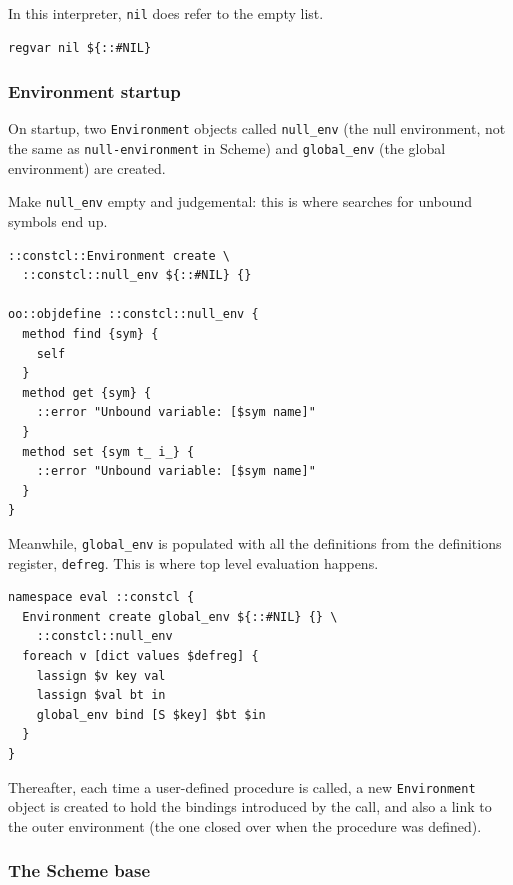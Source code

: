 \documentclass[a5paper,draft]{memoir}
\begin{document}
In this interpreter, \texttt{nil} does refer to the empty list.

\begin{lstlisting}
regvar nil ${::#NIL}
\end{lstlisting}

\subsubsection{Environment startup}
\label{environment-startup}

On startup, two \texttt{Environment} objects called \texttt{null\_env} (the null environment, not the same as \texttt{null-environment} in Scheme) and \texttt{global\_env} (the global environment) are created.

Make \texttt{null\_env} empty and judgemental: this is where searches for unbound symbols end up.

\begin{lstlisting}
::constcl::Environment create \
  ::constcl::null_env ${::#NIL} {}

oo::objdefine ::constcl::null_env {
  method find {sym} {
    self
  }
  method get {sym} {
    ::error "Unbound variable: [$sym name]"
  }
  method set {sym t_ i_} {
    ::error "Unbound variable: [$sym name]"
  }
}
\end{lstlisting}

Meanwhile, \texttt{global\_env} is populated with all the definitions from the definitions register, \texttt{defreg}. This is where top level evaluation happens.
\index{global\_env environment}

\begin{lstlisting}
namespace eval ::constcl {
  Environment create global_env ${::#NIL} {} \
    ::constcl::null_env
  foreach v [dict values $defreg] {
    lassign $v key val
    lassign $val bt in
    global_env bind [S $key] $bt $in
  }
}
\end{lstlisting}

Thereafter, each time a user-defined procedure is called, a new \texttt{Environment} object is created to hold the bindings introduced by the call, and also a link to the outer environment (the one closed over when the procedure was defined).

\subsubsection{The Scheme base}
\label{the-scheme-base}
\end{document}
